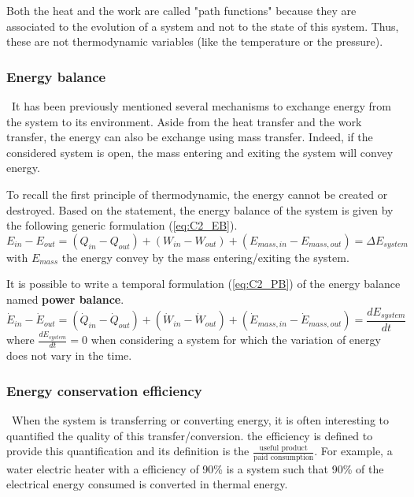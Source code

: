 Both the heat and the work are called "path functions" because they are associated to the evolution of a system and not to the state of this system. Thus, these are not thermodynamic variables (like the temperature or the pressure).

\subsubsection{Energy balance}
\quad\, It has been previously mentioned several mechanisms to exchange energy from the system to its environment. Aside from the heat transfer and the work transfer, the energy can also be exchange using mass transfer. Indeed, if the considered system is open, the mass entering and exiting the system will convey energy.

To recall the first principle of thermodynamic, the energy cannot be created or destroyed. Based on the statement, the energy balance of the system is given by the following generic formulation (\ref{eq:C2_EB}).
\begin{equation}
    E_{in} - E_{out} = (Q_{in} - Q_{out}) + (W_{in} - W_{out}) + (E_{mass,in} - E_{mass,out}) = \Delta E_{system} \label{eq:C2_EB}
\end{equation}
with $E_{mass}$ the energy convey by the mass entering/exiting the system.

It is possible to write a temporal formulation (\ref{eq:C2_PB}) of the energy balance named \textbf{power balance}.  
\begin{equation}
    \dot{E}_{in} - \dot{E}_{out} = (\dot{Q}_{in} - \dot{Q}_{out}) + (\dot{W}_{in} - \dot{W}_{out}) + (\dot{E}_{mass,in} - \dot{E}_{mass,out}) = \frac{dE_{system}}{dt} \label{eq:C2_PB}
\end{equation}
where $\frac{dE_{system}}{dt}=0$ when considering a system for which the variation of energy does not vary in the time.

\subsubsection{Energy conservation efficiency}
\quad\, When the system is transferring or converting energy, it is often interesting to quantified the quality of this transfer/conversion. the efficiency is defined to provide this quantification and its definition is the
$\frac{\text{useful product}}{\text{paid consumption}}$. For example, a water electric heater with a efficiency of 90\% is a system such that 90\% of the electrical energy consumed is converted in thermal energy.  


